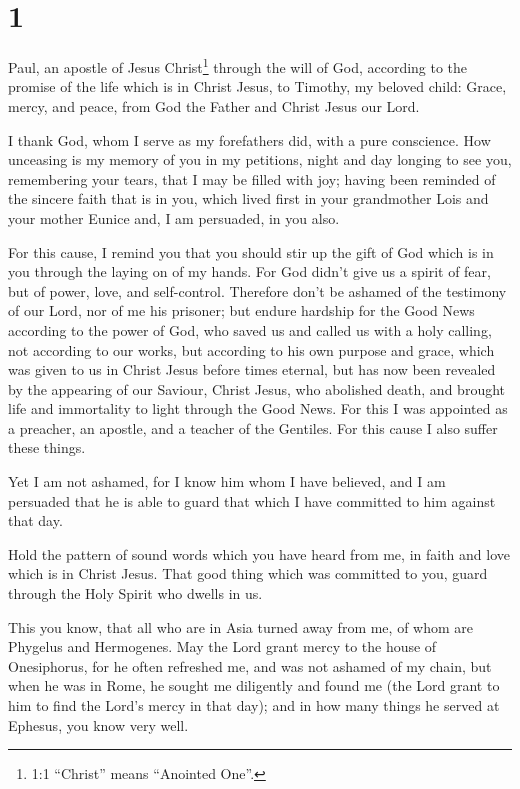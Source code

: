 \hypertarget{section}{%
\section{1}\label{section}}

 Paul, an apostle of Jesus Christ\footnote{1:1 ``Christ''
  means ``Anointed One''.} through the will of God, according to the
promise of the life which is in Christ Jesus,  to Timothy,
my beloved child: Grace, mercy, and peace, from God the Father and
Christ Jesus our Lord.

 I thank God, whom I serve as my forefathers did, with a
pure conscience. How unceasing is my memory of you in my petitions,
night and day  longing to see you, remembering your tears,
that I may be filled with joy;  having been reminded of the
sincere faith that is in you, which lived first in your grandmother Lois
and your mother Eunice and, I am persuaded, in you also.

 For this cause, I remind you that you should stir up the
gift of God which is in you through the laying on of my hands.
 For God didn't give us a spirit of fear, but of power,
love, and self-control.  Therefore don't be ashamed of the
testimony of our Lord, nor of me his prisoner; but endure hardship for
the Good News according to the power of God,  who saved us
and called us with a holy calling, not according to our works, but
according to his own purpose and grace, which was given to us in Christ
Jesus before times eternal,  but has now been revealed by
the appearing of our Saviour, Christ Jesus, who abolished death, and
brought life and immortality to light through the Good News.
 For this I was appointed as a preacher, an apostle, and a
teacher of the Gentiles.  For this cause I also suffer
these things.

Yet I am not ashamed, for I know him whom I have believed, and I am
persuaded that he is able to guard that which I have committed to him
against that day.

 Hold the pattern of sound words which you have heard from
me, in faith and love which is in Christ Jesus.  That good
thing which was committed to you, guard through the Holy Spirit who
dwells in us.

 This you know, that all who are in Asia turned away from
me, of whom are Phygelus and Hermogenes.  May the Lord
grant mercy to the house of Onesiphorus, for he often refreshed me, and
was not ashamed of my chain,  but when he was in Rome, he
sought me diligently and found me  (the Lord grant to him
to find the Lord's mercy in that day); and in how many things he served
at Ephesus, you know very well.

